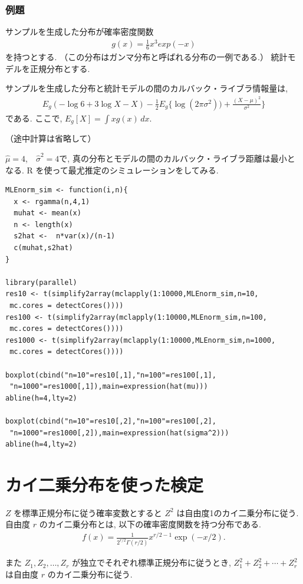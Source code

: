 \documentclass[a4paper, 12pt]{jarticle}
\begin{document}
\subsubsection{例題}
サンプルを生成した分布が確率密度関数
\begin{align}
g(x) = \frac{1}{6}x^3 exp(-x)
\end{align}
を持つとする. （この分布はガンマ分布と呼ばれる分布の一例である.）
統計モデルを正規分布とする. 

サンプルを生成した分布と統計モデルの間のカルバック・ライブラ情報量は, 
 \begin{align}
 E_g (-\log6+3\log X-X)-\frac{1}{2}E_g\{\log(2\pi \sigma^2)) + \frac{(X-\mu)^2}{\sigma^2}\}
 \end{align}
 である. ここで, $E_g[X] = \int xg(x)\, dx$.
 
（途中計算は省略して）

$\hat \mu=4$,　$\hat \sigma^2=4$で, 真の分布とモデルの間のカルバック・ライブラ距離は最小となる. 
R を使って最尤推定のシミュレーションをしてみる.
\begin{verbatim}
MLEnorm_sim <- function(i,n){
  x <- rgamma(n,4,1)
  muhat <- mean(x)
  n <- length(x)
  s2hat <-  n*var(x)/(n-1)
  c(muhat,s2hat)
}

library(parallel)
res10 <- t(simplify2array(mclapply(1:10000,MLEnorm_sim,n=10,
 mc.cores = detectCores())))
res100 <- t(simplify2array(mclapply(1:10000,MLEnorm_sim,n=100,
 mc.cores = detectCores())))
res1000 <- t(simplify2array(mclapply(1:10000,MLEnorm_sim,n=1000,
 mc.cores = detectCores())))

boxplot(cbind("n=10"=res10[,1],"n=100"=res100[,1],
 "n=1000"=res1000[,1]),main=expression(hat(mu)))
abline(h=4,lty=2)

boxplot(cbind("n=10"=res10[,2],"n=100"=res100[,2],
 "n=1000"=res1000[,2]),main=expression(hat(sigma^2)))
abline(h=4,lty=2)
\end{verbatim}

\section{カイ二乗分布を使った検定}

$Z$ を標準正規分布に従う確率変数とすると $Z^2$ は自由度1のカイ二乗分布に従う. 
自由度 $r$ のカイ二乗分布とは, 以下の確率密度関数を持つ分布である. 
\begin{align}
f(x) = \frac{1}{2^{r/2}\Gamma(r/2)}x^{r/2-1}\exp(-x/2).
\end{align}

また $Z_1, Z_2, \ldots, Z_r$ が独立でそれぞれ標準正規分布に従うとき, $Z_1^2+ Z_2^2+ \cdots +Z_r^2$ は自由度 $r$ のカイ二乗分布に従う. 
\end{document}
